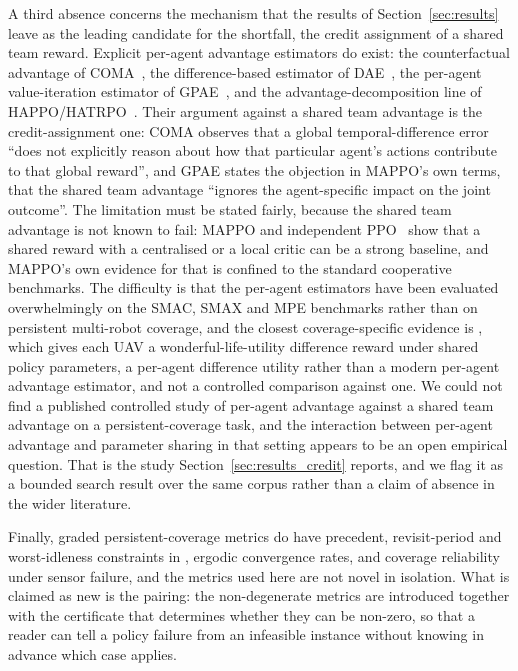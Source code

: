 \documentclass[conference]{IEEEtran}
\begin{document}
A third absence concerns the mechanism that the results of Section~\ref{sec:results} leave as the leading candidate for the shortfall, the credit assignment of a shared team reward. Explicit per-agent advantage estimators do exist: the counterfactual advantage of COMA~\cite{foerster2018}, the difference-based estimator of DAE~\cite{li2022}, the per-agent value-iteration estimator of GPAE~\cite{kim2026}, and the advantage-decomposition line of HAPPO/HATRPO~\cite{kuba2022}. Their argument against a shared team advantage is the credit-assignment one: COMA observes that a global temporal-difference error ``does not explicitly reason about how that particular agent's actions contribute to that global reward'', and GPAE states the objection in MAPPO's own terms, that the shared team advantage ``ignores the agent-specific impact on the joint outcome''. The limitation must be stated fairly, because the shared team advantage is not known to fail: MAPPO and independent PPO~\cite{dewitt2021} show that a shared reward with a centralised or a local critic can be a strong baseline, and MAPPO's own evidence for that is confined to the standard cooperative benchmarks. The difficulty is that the per-agent estimators have been evaluated overwhelmingly on the SMAC, SMAX and MPE benchmarks rather than on persistent multi-robot coverage, and the closest coverage-specific evidence is \cite{sun2023}, which gives each UAV a wonderful-life-utility difference reward under shared policy parameters, a per-agent difference utility rather than a modern per-agent advantage estimator, and not a controlled comparison against one. We could not find a published controlled study of per-agent advantage against a shared team advantage on a persistent-coverage task, and the interaction between per-agent advantage and parameter sharing in that setting appears to be an open empirical question. That is the study Section~\ref{sec:results_credit} reports, and we flag it as a bounded search result over the same corpus rather than a claim of absence in the wider literature.

Finally, graded persistent-coverage metrics do have precedent, revisit-period and worst-idleness constraints in \cite{wang2026}, ergodic convergence rates, and coverage reliability under sensor failure, and the metrics used here are not novel in isolation. What is claimed as new is the pairing: the non-degenerate metrics are introduced together with the certificate that determines whether they can be non-zero, so that a reader can tell a policy failure from an infeasible instance without knowing in advance which case applies.
\end{document}
